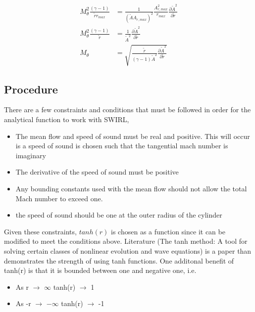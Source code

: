 \documentclass[a4paper]{report}
\begin{document}
\begin{align} 
    M_{\theta}^2
    \frac{\left( \gamma - 1 \right)}{\widetilde{r} r_{max}} &=
    \frac{1}{(\widetilde{A}A_{r,max})^2}\frac{A_{r,max}^2}{r_{max}}
    \frac{\partial \widetilde{A}^2}{\partial \widetilde{r}} \nonumber \\
    M_{\theta}^2     \frac{\left( \gamma - 1 \right)}{\widetilde{r} } &=
    \frac{1}{\widetilde{A}^2}
    \frac{\partial \widetilde{A}^2}{\partial \widetilde{r}} \nonumber \\
    M_{\theta} &= \sqrt{\frac{\widetilde{r}}{(\gamma-1) \widetilde{A}^2}
        \frac{\partial\widetilde{A}^2}{\partial \widetilde{r} }
    } \label{eq:Mthetabackcalculated}
\end{align}

\subsection{Procedure}
There are a few constraints and conditions that must be followed in order for the analytical 
function to work with SWIRL, 

\begin{itemize}
    \item The mean flow and speed of sound must be real and positive. This will 
        occur is a speed of sound is chosen such that the tangential mach number
        is imaginary
    \item The derivative of the speed of sound must be positive
    \item Any bounding constants used with the mean flow should not allow the 
        total Mach number to exceed one.
    \item the speed of sound should be one at the outer radius of the cylinder
\end{itemize}

Given these constraints, $tanh(r)$ is chosen as a function since it can be
modified to meet the conditions above. Literature (The tanh method: A tool for 
solving certain classes of nonlinear evolution and wave equations) 
is a paper than demonstrates the strength of using tanh functions.
One additonal benefit of tanh(r) is that it is bounded between one and negative one, i.e.

\begin{itemize}
    \item As r $\rightarrow$ $\infty$ tanh(r) $\rightarrow$ 1
    \item As -r $\rightarrow$ $-\infty$ tanh(r) $\rightarrow$ -1
\end{itemize}
\end{document}
